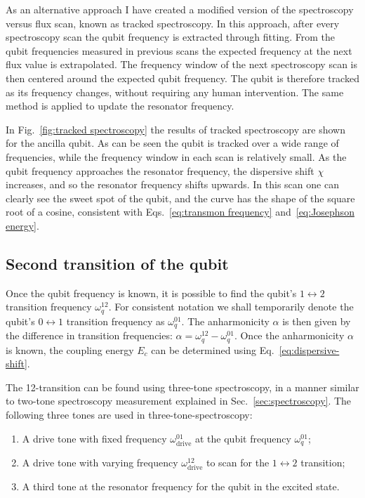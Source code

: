         As an alternative approach I have created a modified version of the spectroscopy versus flux scan, known as tracked spectroscopy. In this approach, after every spectroscopy scan the qubit frequency is extracted through fitting. From the qubit frequencies measured in previous scans the expected frequency at the next flux value is extrapolated. The frequency window of the next spectroscopy scan is then centered around the expected qubit frequency. The qubit is therefore tracked as its frequency changes, without requiring any human intervention. The same method is applied to update the resonator frequency.

        In Fig.~\ref{fig:tracked spectroscopy} the results of tracked spectroscopy are shown for the ancilla qubit. As can be seen the qubit is tracked over a wide range of frequencies, while the frequency window in each scan is relatively small. As the qubit frequency approaches the resonator frequency, the dispersive shift $\chi$ increases, and so the resonator frequency shifts upwards. In this scan one can clearly see the sweet spot of the qubit, and the curve has the shape of the square root of a cosine, consistent with Eqs.~\ref{eq:transmon frequency} and~\ref{eq:Josephson energy}.

      \subsection{Second transition of the qubit}
        \label{ssec:12-transition spectroscopy}
        Once the qubit frequency is known, it is possible to find the qubit's $1 \leftrightarrow 2$ transition frequency $\omega_q^{12}$. For consistent notation we shall temporarily denote the qubit's $0 \leftrightarrow 1$ transition frequency as $\omega_q^{01}$. The anharmonicity $\alpha$ is then given by the difference in transition frequencies: $\alpha = \omega_q^{12} - \omega_q^{01}$. Once the anharmonicity $\alpha$ is known, the coupling energy $E_c$ can be determined using Eq.~\ref{eq:dispersive-shift}.

        The 12-transition can be found using three-tone spectroscopy, in a manner similar to two-tone spectroscopy measurement explained in Sec.~\ref{sec:spectroscopy}. The following three tones are used in three-tone-spectroscopy:

        \begin{enumerate}
          \item A drive tone with fixed frequency $\omega_\text{drive}^{01}$ at the qubit frequency $\omega_q^{01}$;
          \item A drive tone with varying frequency $\omega_\text{drive}^{12}$ to scan for the $1 \leftrightarrow 2$ transition;
          \item A third tone at the resonator frequency for the qubit in the excited state.
        \end{enumerate}

